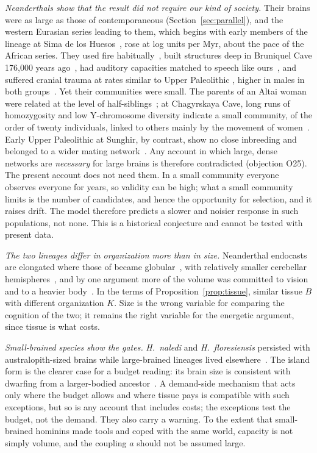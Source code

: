 \emph{Neanderthals show that the result did not require our kind of society.} Their brains were as large as those of
contemporaneous \Hs{} (Section~\ref{sec:parallel}), and the western Eurasian series leading to them, which begins with early members of the lineage
at Sima de los Huesos~\cite{arsuaga2014}, rose at \SerEur{} log units per Myr, about the pace of the African series. They used fire habitually~\cite{roebroeks2011}, built structures deep in
Bruniquel Cave 176,000 years ago~\cite{jaubert2016}, had auditory capacities matched to speech like
ours~\cite{condevalverde2021}, and suffered cranial trauma at rates similar to Upper Paleolithic \Hs, higher in males in both
groups~\cite{beier2018}. Yet their communities were small. The parents of an Altai woman were related at the level of
half-siblings~\cite{prufer2014}; at Chagyrskaya Cave, long runs of homozygosity and low Y-chromosome diversity indicate a
small community, of the order of twenty individuals, linked to others mainly by the movement of women~\cite{skov2022}. Early Upper Paleolithic \Hs{} at
Sunghir, by contrast, show no close inbreeding and belonged to a wider mating network~\cite{sikora2017}. Any account in which
large, dense networks are \emph{necessary} for large brains is therefore contradicted (objection O25). The present account
does not need them. In a small community everyone observes everyone for years, so validity can be high; what a small
community limits is the number of candidates, and hence the opportunity for selection, and it raises drift. The model
therefore predicts a slower and noisier response in such populations, not none. This is a historical conjecture and cannot be
tested with present data.

\emph{The two lineages differ in organization more than in size.} Neanderthal endocasts are elongated where those of
\Hs{} became globular~\cite{neubauer2018}, with relatively smaller cerebellar hemispheres~\cite{kochiyama2018}, and by one
argument more of the volume was committed to vision and to a heavier body~\cite{pearce2013}. In the terms of
Proposition~\ref{prop:tissue}, similar tissue $B$ with different organization $K$. Size is the wrong variable for comparing
the cognition of the two; it remains the right variable for the energetic argument, since tissue is what costs.

\emph{Small-brained species show the gates.} \textit{H.~naledi} and \textit{H.~floresiensis} persisted with
australopith-sized brains while large-brained lineages lived elsewhere~\cite{berger2015,dirks2017,kubo2013,sutikna2016}. The island
form is the clearer case for a budget reading: its brain size is consistent with dwarfing from a larger-bodied
ancestor~\cite{kubo2013}. A demand-side
mechanism that acts only where the budget allows and where tissue pays is compatible with such exceptions, but so is any
account that includes costs; the exceptions test the budget, not the demand. They also carry a warning. To the extent that
small-brained hominins made tools and coped with the same world, capacity is not simply volume, and the coupling $a$ should
not be assumed large.

